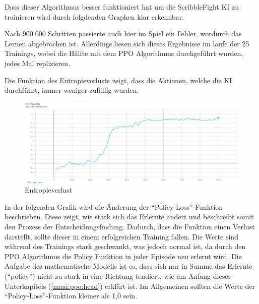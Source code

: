 
Dass dieser Algorithmus besser funktioniert hat um die ScribbleFight KI zu trainieren wird durch folgdenden
Graphen klar erkennbar.

Nach 900.000 Schritten passierte auch hier im Spiel ein Fehler, wordurch das Lernen abgebrochen ist.
Allerdings liesen sich dieses Ergebnisse im laufe der 25 Trainings, wobei die Hälfte mit dem PPO Algorithmus durchgeführt wurden,
jedes Mal replizieren.

Die Funktion des Entropieverlusts zeigt, dass die Aktionen, welche die KI durchführt, immer weniger zufällig
wurden.

\begin{figure}[H]
    \centering
    \includegraphics[scale=0.6]{pics/Tensorboard/PPO/entropy_loss.png}
    \caption{Entropieverlust}
    \label{fig:ppo:entropyloss}
\end{figure}

In der folgenden Grafik wird die Änderung der ``Policy-Loss''-Funktion beschrieben.
Diese zeigt, wie stark sich das Erlernte ändert und beschreibt somit den Prozess der Entscheidungsfindung.
Dadurch, dass die Funktion einen Verlust darstellt, sollte dieser in einem erfolgreichen Training fallen.
Die Werte sind während des Trainings stark geschwankt, was jedoch normal ist,
da durch den PPO Algorithmus die Policy Funktion in jeder Episode neu erlernt wird.
Die Aufgabe des mathematische Modells ist es, dass sich nur in Summe das Erlernte (``policy'') nicht zu stark in eine Richtung tendiert, wie am Anfang dieses Unterkapitels (\ref{maai:ppo:head}) erklärt ist.
Im Allgemeinen sollten die Werte der ``Policy-Loss''-Funktion kleiner als 1,0 sein.

